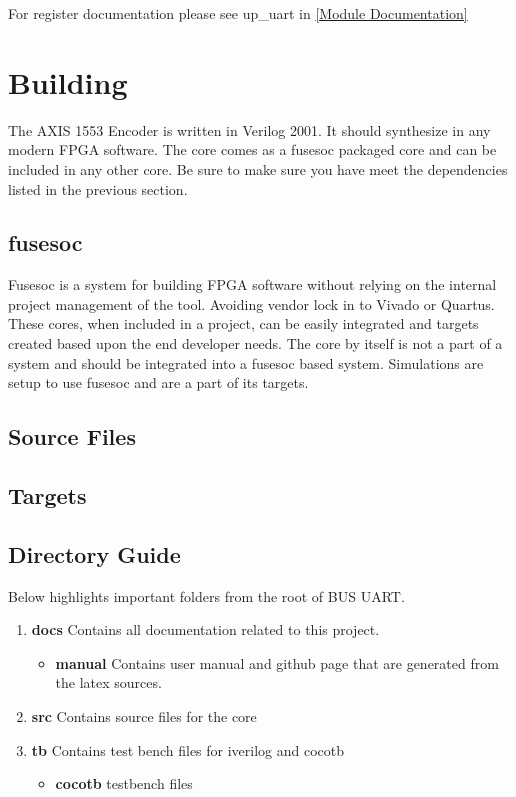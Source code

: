 For register documentation please see up\_uart in \ref{Module Documentation}

\section{Building}

\par
The AXIS 1553 Encoder is written in Verilog 2001. It should synthesize in any modern FPGA software. The core comes as a fusesoc packaged core and can be
included in any other core. Be sure to make sure you have meet the dependencies listed in the previous section.

\subsection{fusesoc}
\par
Fusesoc is a system for building FPGA software without relying on the internal project management of the tool. Avoiding vendor lock in to Vivado or Quartus.
These cores, when included in a project, can be easily integrated and targets created based upon the end developer needs. The core by itself is not a part of
a system and should be integrated into a fusesoc based system. Simulations are setup to use fusesoc and are a part of its targets.

\subsection{Source Files}



\subsection{Targets}



\subsection{Directory Guide}

\par
Below highlights important folders from the root of BUS UART.

\begin{enumerate}
  \item \textbf{docs} Contains all documentation related to this project.
    \begin{itemize}
      \item \textbf{manual} Contains user manual and github page that are generated from the latex sources.
    \end{itemize}
  \item \textbf{src} Contains source files for the core
  \item \textbf{tb} Contains test bench files for iverilog and cocotb
    \begin{itemize}
      \item \textbf{cocotb} testbench files
    \end{itemize}
\end{enumerate}

